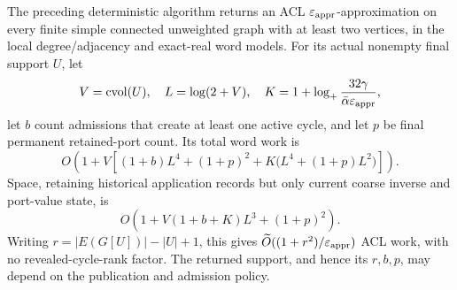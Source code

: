 \begin{theorem}
\label{thm:op3-coarse-publication-acl}
The preceding deterministic algorithm returns an ACL $\varepsilon_{\mathrm{appr}}$-approximation
on every finite simple connected unweighted graph with at least two
vertices, in the local degree/adjacency and exact-real word models.
For its actual nonempty final support $U$, let
\[
 V=\operatorname{cvol}(U),\quad L=\log(2+V),\quad
 K=1+\log_+\frac{32\gamma}{\bar\alpha\varepsilon_{\mathrm{appr}}},
\]
let $b$ count admissions that create at least one active cycle, and let
$p$ be final permanent retained-port count. Its total word work is
\begin{equation}
 O\!\left(1+V\left[(1+b)L^4+(1+p)^2+
              K\bigl(L^4+(1+p)L^2\bigr)\right]\right).
 \label{eq:op3-coarse-publication-work}
\end{equation}
Space, retaining historical application records but only current coarse
inverse and port-value state, is
\begin{equation}
 O\!\left(1+V(1+b+K)L^3+(1+p)^2\right).
 \label{eq:op3-coarse-publication-space}
\end{equation}
Writing $r=|E(G[U])|-|U|+1$, this gives
$\widetilde O((1+r^2)/\varepsilon_{\mathrm{appr}})$ ACL work, with no revealed-cycle-rank
factor. The returned support, and hence its $r,b,p$, may depend on the
publication and admission policy.
\end{theorem}
